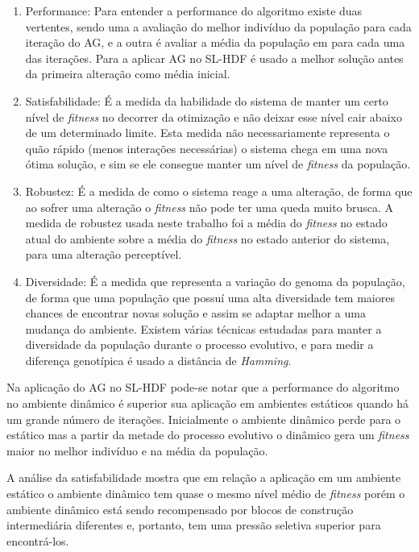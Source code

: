 \begin{enumerate}
\item Performance: Para entender a performance do algoritmo existe duas vertentes, sendo uma a avaliação do melhor indivíduo da população para cada iteração do AG, e a outra é avaliar a média da população em para cada uma das iterações. Para a aplicar AG no SL-HDF é usado a melhor solução antes da primeira alteração como média inicial.

\item Satisfabilidade: É a medida da habilidade do sistema de manter um certo nível de \textit{fitness} no decorrer da otimização e não deixar esse nível cair abaixo de um determinado limite. Esta medida não necessariamente representa o quão rápido (menos interações necessárias) o sistema chega em uma nova ótima solução, e sim se ele consegue manter um nível de \textit{fitness} da população.

\item Robustez: É a medida de como o sistema reage a uma alteração, de forma que ao sofrer uma alteração o \textit{fitness} não pode ter uma queda muito brusca. A medida de robustez usada neste trabalho foi a média do \textit{fitness} no estado atual do ambiente sobre a média do \textit{fitness} no estado anterior do sistema, para uma alteração perceptível.

\item Diversidade: É a medida que representa a variação do genoma da população, de forma que uma população que possuí uma alta diversidade tem maiores chances de encontrar novas solução e assim se adaptar melhor a uma mudança do ambiente. Existem várias técnicas estudadas para manter a diversidade da população durante o processo evolutivo, e para medir a diferença genotípica é usado a distância de \textit{Hamming}.
\end{enumerate}

Na aplicação do AG no SL-HDF pode-se notar que a performance do algoritmo no ambiente dinâmico é superior sua aplicação em ambientes estáticos quando há um grande número de iterações. Inicialmente o ambiente dinâmico perde para o estático mas a partir da metade do processo evolutivo o dinâmico gera um \textit{fitness} maior no melhor indivíduo e na média da população.

A análise da satisfabilidade mostra que em relação a aplicação em um ambiente estático o ambiente dinâmico tem quase o mesmo nível médio de \textit{fitness} porém o ambiente dinâmico está sendo recompensado por blocos de construção intermediária diferentes e, portanto, tem uma pressão seletiva superior para encontrá-los.

